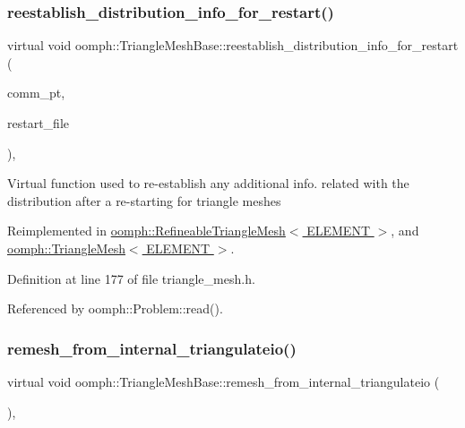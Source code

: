 \subsubsection{\texorpdfstring{reestablish\+\_\+distribution\+\_\+info\+\_\+for\+\_\+restart()}{reestablish\_distribution\_info\_for\_restart()}}
{\footnotesize\ttfamily virtual void oomph\+::\+Triangle\+Mesh\+Base\+::reestablish\+\_\+distribution\+\_\+info\+\_\+for\+\_\+restart (\begin{DoxyParamCaption}\item[{\hyperlink{classoomph_1_1OomphCommunicator}{Oomph\+Communicator} $\ast$}]{comm\+\_\+pt,  }\item[{std\+::istream \&}]{restart\+\_\+file }\end{DoxyParamCaption})\hspace{0.3cm}{\ttfamily [inline]}, {\ttfamily [virtual]}}

Virtual function used to re-\/establish any additional info. related with the distribution after a re-\/starting for triangle meshes 

Reimplemented in \hyperlink{classoomph_1_1RefineableTriangleMesh_a3ecdb3b15c3fefbc96f407c4fdf5b155}{oomph\+::\+Refineable\+Triangle\+Mesh$<$ E\+L\+E\+M\+E\+N\+T $>$}, and \hyperlink{classoomph_1_1TriangleMesh_aa4b1cfd4537c1e511fe1f2fb14b1e8a6}{oomph\+::\+Triangle\+Mesh$<$ E\+L\+E\+M\+E\+N\+T $>$}.



Definition at line 177 of file triangle\+\_\+mesh.\+h.



Referenced by oomph\+::\+Problem\+::read().

\mbox{\label{classoomph_1_1TriangleMeshBase_a2e7f54673e522b9be0543f0256afd04b}} 
\subsubsection{\texorpdfstring{remesh\+\_\+from\+\_\+internal\+\_\+triangulateio()}{remesh\_from\_internal\_triangulateio()}}
{\footnotesize\ttfamily virtual void oomph\+::\+Triangle\+Mesh\+Base\+::remesh\+\_\+from\+\_\+internal\+\_\+triangulateio (\begin{DoxyParamCaption}{ }\end{DoxyParamCaption})\hspace{0.3cm}{\ttfamily [inline]}, {\ttfamily [virtual]}}



